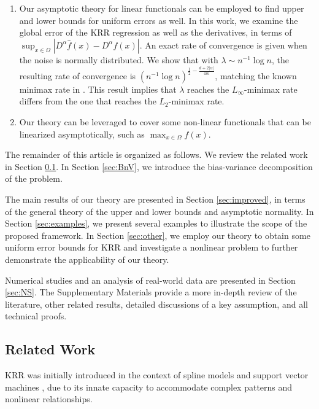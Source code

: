 \documentclass[12pt]{article}
\theoremstyle{plain}
\theoremstyle{remark}
\begin{document}
\begin{enumerate}
\item Our asymptotic theory for linear functionals can be employed to find upper and lower bounds for uniform errors as well. In this work, we examine the global error of the KRR regression as well as the derivatives, in terms of $\sup_{x\in\Omega}|D^\alpha \hat{f}(x)-D^\alpha f(x)|$. An exact rate of convergence is given when the noise is normally distributed. We show that with $\lambda\sim n^{-1}\log n$, the resulting rate of convergence is $(n^{-1}\log n)^{\frac{1}{2}-\frac{d+2|\alpha|}{4m}}$, matching the known minimax rate in \cite{nemirovski2000topics}.
This result implies that $\lambda$ reaches the $L_\infty$-minimax rate differs from the one that reaches the $L_2$-minimax rate.

\item Our theory can be leveraged to cover some non-linear functionals that can be linearized asymptotically, such as $\max_{x\in\Omega}f(x)$.
\end{enumerate}









The remainder of this article is organized as follows. We review the related work in Section \ref{subsec:literature}. In Section \ref{sec:BnV}, we introduce the bias-variance decomposition of the problem. 

The main results of our theory are presented in Section \ref{sec:improved}, in terms of the general theory of the upper and lower bounds and asymptotic normality. In Section \ref{sec:examples}, we present several examples to illustrate the scope of the proposed framework. In Section \ref{sec:other}, we employ our theory to obtain some uniform error bounds for KRR and investigate a nonlinear problem to further demonstrate the applicability of our theory. 

Numerical studies and an analysis of real-world data are presented in Section \ref{sec:NS}.
The Supplementary Materials provide a more in-depth review of the literature, other related results, detailed discussions of a key assumption, and all technical proofs.









\subsection{Related Work}\label{subsec:literature}
KRR was initially introduced in the context of spline models \citep{wahba1978improper} and support vector machines \citep{boser1992training}, due to its innate capacity to accommodate complex patterns and nonlinear relationships. 
\end{document}
